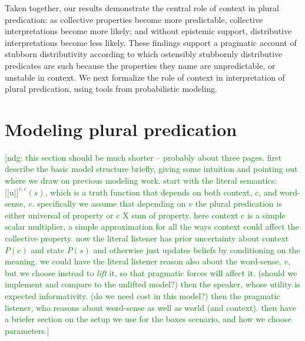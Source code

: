 \documentclass[linguex]{sp}
\newcommand{\sem}[1]{\mbox{$[\![$#1$]\!]$}}
\newcommand{\ndg}[1]{\textcolor{Green}{[ndg: #1]}}
\begin{document}
Taken together, our results demonstrate the central role of context in plural predication: as collective properties become more predictable, collective interpretations become more likely; and without epistemic support, distributive interpretations become less likely. These findings support a pragmatic account of stubborn distributivity according to which ostensibly stubbornly distributive predicates are such because the properties they name are unpredictable, or unstable in context. We next formalize the role of context in interpretation of plural predication, using tools from probabilistic modeling.




\section{Modeling plural predication}
\label{model}

\ndg{this section should be much shorter -- probably about three pages. 
%
first describe the basic model structure briefly, giving some intuition and pointing out where we draw on previous modeling work.
%
start with the literal semantics: $\sem{u}^{v,c}(s)$, which is a truth function that depends on both context, $c$, and word-sense, $v$. specifically we assume that depending on $v$ the plural predication is either universal of property or c X sum of property. here context c is a simple scalar multiplier, a simple approximation for all the ways context could affect the collective property.
%
now the literal listener has prior uncertainty about context $P(c)$ and state $P(s)$ and otherwise just updates beliefs by conditioning on the meaning. we could have the literal listener reason also about the word-sense, $v$, but we choose instead to \emph{lift} it, so that pragmatic forces will affect it. (should we implement and compare to the unlifted model?)
%
then the speaker, whose utility is expected informativity. (do we need cost in this model?)
then the pragmatic listener, who reasons about word-sense as well as world (and context).
%
then have a briefer section on the setup we use for the boxes scenario, and how we choose parameters.}
\end{document}
